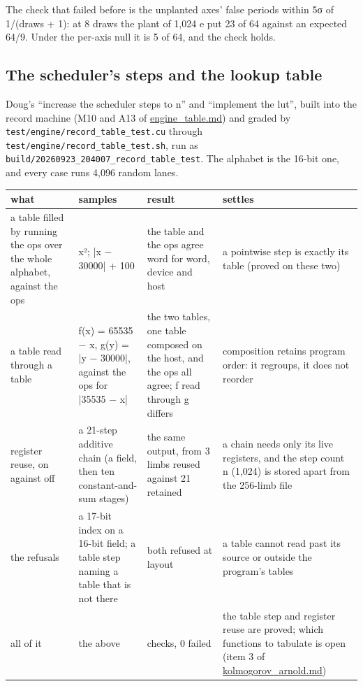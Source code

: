 The check that failed before is the unplanted axes' false periods within 5σ of 1/(draws + 1): at 8 draws the plant of 1,024 e put 23 of 64 against an expected 64/9. Under the per-axis null it is 5 of 64, and the check holds.

\subsection{\texorpdfstring{The scheduler's steps and the lookup table}{The scheduler's steps and the lookup table}}

Doug's “increase the scheduler steps to n” and “implement the lut”, built into the record machine (M10 and A13 of \hyperref[chap:engine-table]{engine\_\allowbreak{}table.md}) and graded by \texttt{test/\allowbreak{}engine/\allowbreak{}record\_\allowbreak{}table\_\allowbreak{}test.\allowbreak{}cu} through \texttt{test/\allowbreak{}engine/\allowbreak{}record\_\allowbreak{}table\_\allowbreak{}test.\allowbreak{}sh}, run as \texttt{build/\allowbreak{}20260923\_\allowbreak{}204007\_\allowbreak{}record\_\allowbreak{}table\_\allowbreak{}test}. The alphabet is the 16-bit one, and every case runs 4,096 random lanes.

{\footnotesize
\setlength{\tabcolsep}{6pt}
\begin{longtable}{>{\RaggedRight\arraybackslash}p{}>{\RaggedRight\arraybackslash}p{}>{\RaggedRight\arraybackslash}p{}>{\RaggedRight\arraybackslash}p{}}
\toprule
what & samples & result & settles \\
\midrule
\endhead
a table filled by running the ops over the whole alphabet, against the ops & x²; |x − 30000| + 100 & the table and the ops agree word for word, device and host & a pointwise step is exactly its table (proved on these two) \\
a table read through a table & f(x) = 65535 − x, g(y) = |y − 30000|, against the ops for |35535 − x| & the two tables, one table composed on the host, and the ops all agree; f read through g differs & composition retains program order: it regroups, it does not reorder \\
register reuse, on against off & a 21-step additive chain (a field, then ten constant-and-sum stages) & the same output, from 3 limbs reused against 21 retained & a chain needs only its live registers, and the step count n (1,024) is stored apart from the 256-limb file \\
the refusals & a 17-bit index on a 16-bit field; a table step naming a table that is not there & both refused at layout & a table cannot read past its source or outside the program's tables \\
all of it & the above & 15 checks, 0 failed & the table step and register reuse are proved; which functions to tabulate is open (item 3 of \hyperref[chap:kolmogorov-arnold]{kolmogorov\_\allowbreak{}arnold.md}) \\
\bottomrule
\end{longtable}
}

